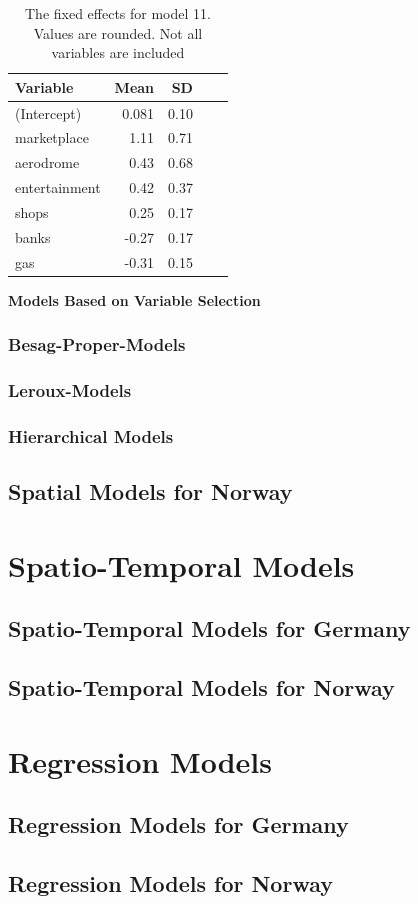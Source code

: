 \begin{table}[H] 
\caption{The fixed effects for model 11. Values are rounded. Not all variables are included\label{fixed11}}
\begin{tabular}{l r r r r}
\toprule
\textbf{Variable}	& \textbf{Mean}	& \textbf{SD} \\
\midrule
(Intercept) & 0.081 & 0.10 \\
marketplace & 1.11 & 0.71 \\
aerodrome & 0.43 & 0.68 \\
entertainment & 0.42 & 0.37 \\
shops & 0.25 & 0.17 \\
banks & -0.27 & 0.17 \\
gas & -0.31 & 0.15 \\
\bottomrule
\end{tabular}
\end{table}
\textbf{Models Based on Variable Selection} 
\subsubsection{Besag-Proper-Models}
\subsubsection{Leroux-Models}
\subsubsection{Hierarchical Models}
\subsection{Spatial Models for Norway}
\clearpage
\section{Spatio-Temporal Models}
\subsection{Spatio-Temporal Models for Germany}
\subsection{Spatio-Temporal Models for Norway}
\section{Regression Models}
\clearpage
\subsection{Regression Models for Germany}
\subsection{Regression Models for Norway}